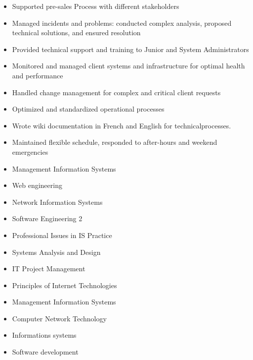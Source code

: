 \documentclass[10pt,a4paper,ragged2e,withhyper]{altacv}
\begin{document}
\begin{paracol}{2}
\divider

\begin{itemize}
\item Supported pre-sales Process with different stakeholders
\item Managed incidents and problems: conducted complex analysis, proposed technical solutions, and ensured resolution
\item Provided technical support and training to Junior and System Administrators
\item Monitored and managed client systems and infrastructure for optimal health and performance
\item Handled change management for complex and critical client requests
\item Optimized and standardized operational processes
\item Wrote wiki documentation in French and English for technicalprocesses.
\item Maintained flexible schedule, responded to after-hours and weekend emergencies
\end{itemize}

\switchcolumn


\begin{itemize}[label=\textcolor{DarkPastelRed}{$\triangleright$}]
\item Management Information Systems
\item Web engineering
\item Network Information Systems
\item Software Engineering 2
\item Professional Issues in IS Practice
\item Systems Analysis and Design
\item IT Project Management
\item Principles of Internet Technologies
\item Management Information Systems
\item Computer Network Technology
\item Informations systems
\item Software development
\end{itemize}



\end{paracol}
\end{document}
